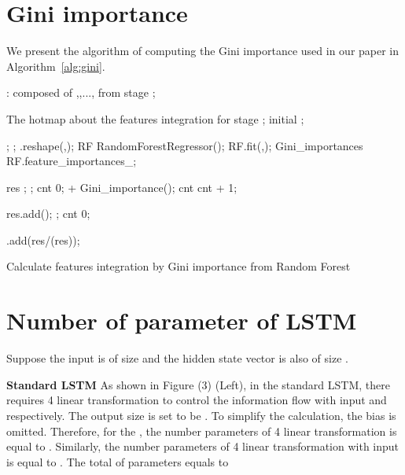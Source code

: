 \documentclass[letterpaper]{article} \usepackage{aaai20}  \usepackage{times}  \usepackage{helvet} \usepackage{courier}  \usepackage[hyphens]{url}  \usepackage{graphicx} \urlstyle{rm} \def\UrlFont{\rm}  \usepackage{graphicx}  \frenchspacing  \setlength{\pdfpagewidth}{8.5in}  \setlength{\pdfpageheight}{11in}  \usepackage{color}
\begin{document}
	
	\section{Gini importance}
	We present the algorithm of computing the Gini importance used in our paper in Algorithm~\ref{alg:gini}.
	
	\begin{algorithm}[h]  
		\begin{algorithmic}[1]  
			\Require  
			: composed of ,,..., from stage ;
			
			{\color[RGB]{162,205,133}{\#The size of  is ()}}
			
			{\color[RGB]{162,205,133}{\# denotes the batch size of }}
			
			{\color[RGB]{162,205,133}{\# denotes the number of the feature maps' channel in current stage}}
			
			{\color[RGB]{162,205,133}{\# denotes the number of layers in current stage}}
			
			\Ensure  
			The hotmap  about the features integration for stage ;
			\State initial   ; 
			
			\State ;
			\State ;
			\State   .reshape(,);
			\State RF  RandomForestRegressor();
			\State RF.fit(,);
			\State Gini\_importances  RF.feature\_importances\_;
			
			
			{\color[RGB]{162,205,133}{\#The length of Gini\_importance is }}
			
			
			\State res  ; 
			; 
			\State cnt  0;
			\State    + Gini\_importance();
			\State cnt  cnt + 1;
			
			\State res.add();
			;
			\State cnt  0;
			\EndIf  
			
			.add(res/(res));
			
			\EndFor
			
			\EndFor  
			
		\end{algorithmic}  
		\caption{Calculate features integration by Gini importance from Random Forest}  
		\label{alg:gini}  
	\end{algorithm}  
	
	
	\section{Number of parameter of LSTM}
	Suppose the input  is of size  and the hidden state vector  is also of size .
	
	\textbf{Standard LSTM}
	As shown in Figure (3) (Left), in the standard LSTM, there requires 4 linear transformation to control the information flow with input  and  respectively. The output size is set to be . To simplify the calculation, the bias is omitted. Therefore, for the , the number parameters of 4 linear transformation is equal to . Similarly, the number parameters of 4 linear transformation with input  is equal to . The total of parameters equals to 
	
\end{document}
